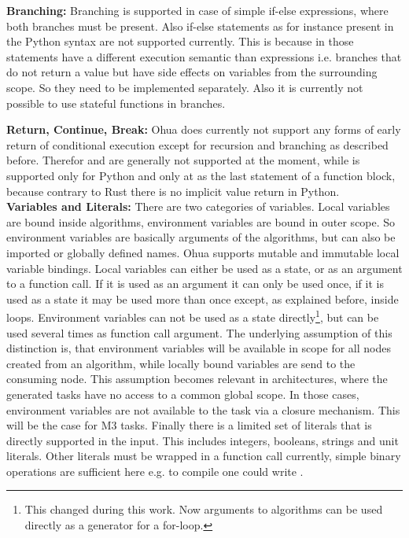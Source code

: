 \textbf{Branching:} Branching is supported in case of simple if-else expressions, where both branches must be present. Also if-else statements as for instance present in the Python syntax are not supported currently. This is because in those statements have a different execution semantic than expressions i.e. branches that do not return a value but have side effects on variables from the surrounding scope. So they need to be implemented separately. Also it is currently not possible to use  stateful functions in branches.

\textbf{Return, Continue, Break:} Ohua does currently not support any forms of early return of conditional execution except for recursion and branching as described before. Therefor  and  are generally not supported at the moment, while  is supported only for Python and only at as the last statement of a function block, because contrary to Rust there is no implicit value return in Python. \\

\textbf{Variables and Literals:} There are two categories of variables. Local variables are bound inside algorithms, environment variables are bound in outer scope. So environment variables are basically arguments of the algorithms, but can also be imported or globally defined names. Ohua supports mutable and immutable local variable bindings. Local variables can either be used as a state, or as an argument to a function call. If it is used as an argument it can only be used once, if it is used as a state it may be used more than once except, as explained before, inside loops. Environment variables can not be used as a state directly\footnote{This changed during this work. Now arguments to algorithms can be used directly as a generator for a for-loop.}, but can be used several times as function call argument. The underlying assumption of this distinction is, that environment variables will be available in scope for all nodes created from an algorithm, while locally bound variables are send to the consuming node. This assumption becomes relevant in architectures, where the generated tasks have no access to a common global scope. In those cases, environment variables are not available to the task via a closure mechanism. This will be the case for M3 tasks. 
Finally there is a limited set of literals that is directly supported in the input. This includes integers, booleans, strings and unit literals. Other literals must be wrapped in a function call currently, simple binary operations are sufficient here e.g. to compile  one could write .

